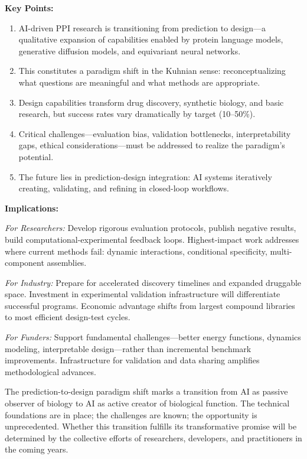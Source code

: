\vspace{1em}
\noindent
\textbf{Key Points:}
\begin{enumerate}
    \item AI-driven PPI research is transitioning from prediction to design---a qualitative expansion of capabilities enabled by protein language models, generative diffusion models, and equivariant neural networks.
    \item This constitutes a paradigm shift in the Kuhnian sense: reconceptualizing what questions are meaningful and what methods are appropriate.
    \item Design capabilities transform drug discovery, synthetic biology, and basic research, but success rates vary dramatically by target (10--50\%).
    \item Critical challenges---evaluation bias, validation bottlenecks, interpretability gaps, ethical considerations---must be addressed to realize the paradigm's potential.
    \item The future lies in prediction-design integration: AI systems iteratively creating, validating, and refining in closed-loop workflows.
\end{enumerate}

\vspace{1em}
\noindent
\textbf{Implications:}

\noindent
\textit{For Researchers:} Develop rigorous evaluation protocols, publish negative results, build computational-experimental feedback loops. Highest-impact work addresses where current methods fail: dynamic interactions, conditional specificity, multi-component assemblies.

\noindent
\textit{For Industry:} Prepare for accelerated discovery timelines and expanded druggable space. Investment in experimental validation infrastructure will differentiate successful programs. Economic advantage shifts from largest compound libraries to most efficient design-test cycles.

\noindent
\textit{For Funders:} Support fundamental challenges---better energy functions, dynamics modeling, interpretable design---rather than incremental benchmark improvements. Infrastructure for validation and data sharing amplifies methodological advances.

\vspace{1em}
\noindent
The prediction-to-design paradigm shift marks a transition from AI as passive observer of biology to AI as active creator of biological function. The technical foundations are in place; the challenges are known; the opportunity is unprecedented. Whether this transition fulfills its transformative promise will be determined by the collective efforts of researchers, developers, and practitioners in the coming years.
